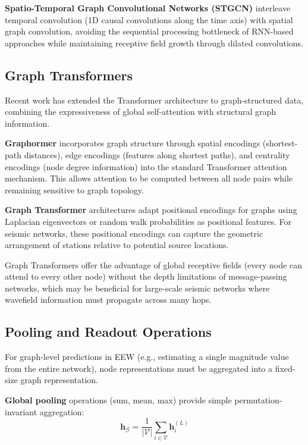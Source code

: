 \documentclass[review,authoryear]{elsarticle}
\begin{document}
\textbf{Spatio-Temporal Graph Convolutional Networks (STGCN)} \citep{yu2018spatio} interleave temporal convolution (1D causal convolutions along the time axis) with spatial graph convolution, avoiding the sequential processing bottleneck of RNN-based approaches while maintaining receptive field growth through dilated convolutions.

\subsection{Graph Transformers}

Recent work has extended the Transformer architecture \citep{vaswani2017attention} to graph-structured data, combining the expressiveness of global self-attention with structural graph information.

\textbf{Graphormer} \citep{ying2021transformers} incorporates graph structure through spatial encodings (shortest-path distances), edge encodings (features along shortest paths), and centrality encodings (node degree information) into the standard Transformer attention mechanism. This allows attention to be computed between all node pairs while remaining sensitive to graph topology.

\textbf{Graph Transformer} architectures \citep{dwivedi2021generalization} adapt positional encodings for graphs using Laplacian eigenvectors or random walk probabilities as positional features. For seismic networks, these positional encodings can capture the geometric arrangement of stations relative to potential source locations.

Graph Transformers offer the advantage of global receptive fields (every node can attend to every other node) without the depth limitations of message-passing networks, which may be beneficial for large-scale seismic networks where wavefield information must propagate across many hops.

\subsection{Pooling and Readout Operations}

For graph-level predictions in EEW (e.g., estimating a single magnitude value from the entire network), node representations must be aggregated into a fixed-size graph representation.

\textbf{Global pooling} operations (sum, mean, max) provide simple permutation-invariant aggregation:
\begin{equation}
\mathbf{h}_{\mathcal{G}} = \frac{1}{|\mathcal{V}|} \sum_{i \in \mathcal{V}} \mathbf{h}_i^{(L)}
\end{equation}
\end{document}
